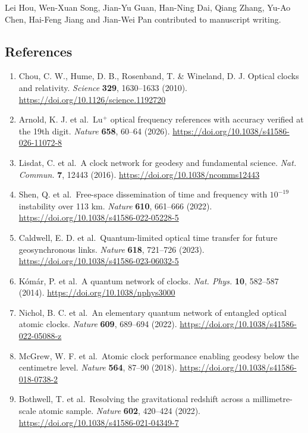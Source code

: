 \documentclass[
  11pt,
  a4paper,
]{article}
\providecommand{\tightlist}{%
  \setlength{\itemsep}{0pt}\setlength{\parskip}{0pt}}
\begin{document}
Lei Hou, Wen-Xuan Song, Jian-Yu Guan, Han-Ning Dai, Qiang Zhang, Yu-Ao
Chen, Hai-Feng Jiang and Jian-Wei Pan contributed to manuscript writing.

\hypertarget{references}{%
\subsection{References}\label{references}}

\begin{enumerate}
\def\labelenumi{\arabic{enumi}.}
\tightlist
\item
  Chou, C. W., Hume, D. B., Rosenband, T. \& Wineland, D. J. Optical
  clocks and relativity. \emph{Science} \textbf{329}, 1630--1633 (2010).
  \url{https://doi.org/10.1126/science.1192720}
\item
  Arnold, K. J. et al.~Lu\(^+\) optical frequency references with
  accuracy verified at the 19th digit. \emph{Nature} \textbf{658},
  60--64 (2026). \url{https://doi.org/10.1038/s41586-026-11072-8}
\item
  Lisdat, C. et al.~A clock network for geodesy and fundamental science.
  \emph{Nat. Commun.} \textbf{7}, 12443 (2016).
  \url{https://doi.org/10.1038/ncomms12443}
\item
  Shen, Q. et al.~Free-space dissemination of time and frequency with
  \(10^{-19}\) instability over 113 km. \emph{Nature} \textbf{610},
  661--666 (2022). \url{https://doi.org/10.1038/s41586-022-05228-5}
\item
  Caldwell, E. D. et al.~Quantum-limited optical time transfer for
  future geosynchronous links. \emph{Nature} \textbf{618}, 721--726
  (2023). \url{https://doi.org/10.1038/s41586-023-06032-5}
\item
  Kómár, P. et al.~A quantum network of clocks. \emph{Nat. Phys.}
  \textbf{10}, 582--587 (2014). \url{https://doi.org/10.1038/nphys3000}
\item
  Nichol, B. C. et al.~An elementary quantum network of entangled
  optical atomic clocks. \emph{Nature} \textbf{609}, 689--694 (2022).
  \url{https://doi.org/10.1038/s41586-022-05088-z}
\item
  McGrew, W. F. et al.~Atomic clock performance enabling geodesy below
  the centimetre level. \emph{Nature} \textbf{564}, 87--90 (2018).
  \url{https://doi.org/10.1038/s41586-018-0738-2}
\item
  Bothwell, T. et al.~Resolving the gravitational redshift across a
  millimetre-scale atomic sample. \emph{Nature} \textbf{602}, 420--424
  (2022). \url{https://doi.org/10.1038/s41586-021-04349-7}

\end{enumerate}
\end{document}
